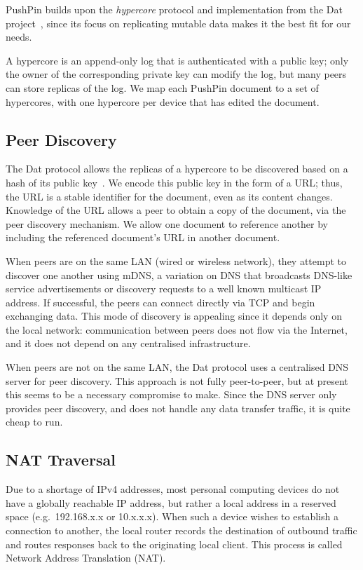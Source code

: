 \documentclass[sigplan,10pt]{acmart}
\begin{document}
PushPin builds upon the \emph{hypercore} protocol and implementation from the Dat project~\cite{HowDatWorks}, since its focus on replicating mutable data makes it the best fit for our needs.

A hypercore is an append-only log that is authenticated with a public key; only the owner of the corresponding private key can modify the log, but many peers can store replicas of the log.
We map each PushPin document to a set of hypercores, with one hypercore per device that has edited the document.

\subsection{Peer Discovery}

The Dat protocol allows the replicas of a hypercore to be discovered based on a hash of its public key~\cite{HowDatWorks}.
We encode this public key in the form of a URL; thus, the URL is a stable identifier for the document, even as its content changes.
Knowledge of the URL allows a peer to obtain a copy of the document, via the peer discovery mechanism.
We allow one document to reference another by including the referenced document's URL in another document.

When peers are on the same LAN (wired or wireless network), they attempt to discover one another using mDNS, a variation on DNS that broadcasts DNS-like service advertisements or discovery requests to a well known multicast IP address.
If successful, the peers can connect directly via TCP and begin exchanging data.
This mode of discovery is appealing since it depends only on the local network: communication between peers does not flow via the Internet, and it does not depend on any centralised infrastructure.

When peers are not on the same LAN, the Dat protocol uses a centralised DNS server for peer discovery.
This approach is not fully peer-to-peer, but at present this seems to be a necessary compromise to make.
Since the DNS server only provides peer discovery, and does not handle any data transfer traffic, it is quite cheap to run.

\subsection{NAT Traversal}\label{sec:nat-traversal}

Due to a shortage of IPv4 addresses, most personal computing devices do not have a globally reachable IP address, but rather a local address in a reserved space (e.g.\ 192.168.x.x or 10.x.x.x).
When such a device wishes to establish a connection to another, the local router records the destination of outbound traffic and routes responses back to the originating local client.
This process is called Network Address Translation (NAT).
\end{document}
